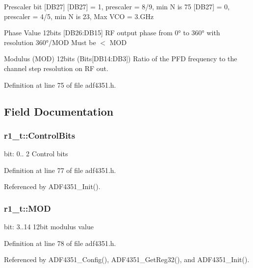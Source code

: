 Prescaler bit \mbox{[}D\+B27\mbox{]} \mbox{[}D\+B27\mbox{]} = 1, prescaler = 8/9, min N is 75 \mbox{[}D\+B27\mbox{]} = 0, prescaler = 4/5, min N is 23, Max V\+CO = 3.\+G\+Hz

Phase Value 12bits \mbox{[}D\+B26\+:D\+B15\mbox{]} RF output phase from 0° to 360° with resolution 360°/\+M\+OD Must be $<$ M\+OD

Modulus (M\+OD) 12bits (Bits\mbox{[}D\+B14\+:D\+B3\mbox{]}) Ratio of the P\+FD frequency to the channel step resolution on RF out. 

Definition at line 75 of file adf4351.\+h.



\subsection{Field Documentation}
\subsubsection[{\texorpdfstring{Control\+Bits}{ControlBits}}]{ r1\+\_\+t\+::\+Control\+Bits}\hypertarget{structr1__t_a5335bbd53d06ad7afb879d919033404c}{}\label{structr1__t_a5335bbd53d06ad7afb879d919033404c}
bit\+: 0.. 2 Control bits 

Definition at line 77 of file adf4351.\+h.



Referenced by A\+D\+F4351\+\_\+\+Init().

\subsubsection[{\texorpdfstring{M\+OD}{MOD}}]{ r1\+\_\+t\+::\+M\+OD}\hypertarget{structr1__t_a9ea14fcf64bbacfbcfa5afa992c0b87d}{}\label{structr1__t_a9ea14fcf64bbacfbcfa5afa992c0b87d}
bit\+: 3..14 12bit modulus value 

Definition at line 78 of file adf4351.\+h.



Referenced by A\+D\+F4351\+\_\+\+Config(), A\+D\+F4351\+\_\+\+Get\+Reg32(), and A\+D\+F4351\+\_\+\+Init().

